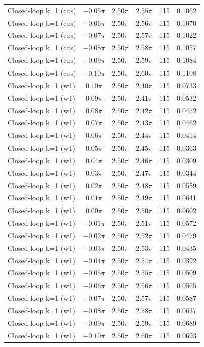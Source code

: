 \begin{tabular}{lccccc}
Closed-loop k=1 (cos) & $-0.05\pi$ & $2.50\pi$ & $2.55\pi$ & 115 & 0.1062 \\
Closed-loop k=1 (cos) & $-0.06\pi$ & $2.50\pi$ & $2.56\pi$ & 115 & 0.1070 \\
Closed-loop k=1 (cos) & $-0.07\pi$ & $2.50\pi$ & $2.57\pi$ & 115 & 0.1022 \\
Closed-loop k=1 (cos) & $-0.08\pi$ & $2.50\pi$ & $2.58\pi$ & 115 & 0.1057 \\
Closed-loop k=1 (cos) & $-0.09\pi$ & $2.50\pi$ & $2.59\pi$ & 115 & 0.1084 \\
Closed-loop k=1 (cos) & $-0.10\pi$ & $2.50\pi$ & $2.60\pi$ & 115 & 0.1108 \\
Closed-loop k=1 (w1) & $0.10\pi$ & $2.50\pi$ & $2.40\pi$ & 115 & 0.0733 \\
Closed-loop k=1 (w1) & $0.09\pi$ & $2.50\pi$ & $2.41\pi$ & 115 & 0.0532 \\
Closed-loop k=1 (w1) & $0.08\pi$ & $2.50\pi$ & $2.42\pi$ & 115 & 0.0472 \\
Closed-loop k=1 (w1) & $0.07\pi$ & $2.50\pi$ & $2.43\pi$ & 115 & 0.0462 \\
Closed-loop k=1 (w1) & $0.06\pi$ & $2.50\pi$ & $2.44\pi$ & 115 & 0.0414 \\
Closed-loop k=1 (w1) & $0.05\pi$ & $2.50\pi$ & $2.45\pi$ & 115 & 0.0363 \\
Closed-loop k=1 (w1) & $0.04\pi$ & $2.50\pi$ & $2.46\pi$ & 115 & 0.0309 \\
Closed-loop k=1 (w1) & $0.03\pi$ & $2.50\pi$ & $2.47\pi$ & 115 & 0.0344 \\
Closed-loop k=1 (w1) & $0.02\pi$ & $2.50\pi$ & $2.48\pi$ & 115 & 0.0559 \\
Closed-loop k=1 (w1) & $0.01\pi$ & $2.50\pi$ & $2.49\pi$ & 115 & 0.0641 \\
Closed-loop k=1 (w1) & $0.00\pi$ & $2.50\pi$ & $2.50\pi$ & 115 & 0.0602 \\
Closed-loop k=1 (w1) & $-0.01\pi$ & $2.50\pi$ & $2.51\pi$ & 115 & 0.0572 \\
Closed-loop k=1 (w1) & $-0.02\pi$ & $2.50\pi$ & $2.52\pi$ & 115 & 0.0479 \\
Closed-loop k=1 (w1) & $-0.03\pi$ & $2.50\pi$ & $2.53\pi$ & 115 & 0.0435 \\
Closed-loop k=1 (w1) & $-0.04\pi$ & $2.50\pi$ & $2.54\pi$ & 115 & 0.0392 \\
Closed-loop k=1 (w1) & $-0.05\pi$ & $2.50\pi$ & $2.55\pi$ & 115 & 0.0509 \\
Closed-loop k=1 (w1) & $-0.06\pi$ & $2.50\pi$ & $2.56\pi$ & 115 & 0.0565 \\
Closed-loop k=1 (w1) & $-0.07\pi$ & $2.50\pi$ & $2.57\pi$ & 115 & 0.0587 \\
Closed-loop k=1 (w1) & $-0.08\pi$ & $2.50\pi$ & $2.58\pi$ & 115 & 0.0637 \\
Closed-loop k=1 (w1) & $-0.09\pi$ & $2.50\pi$ & $2.59\pi$ & 115 & 0.0689 \\
Closed-loop k=1 (w1) & $-0.10\pi$ & $2.50\pi$ & $2.60\pi$ & 115 & 0.0693 \\
\bottomrule
\end{tabular}
